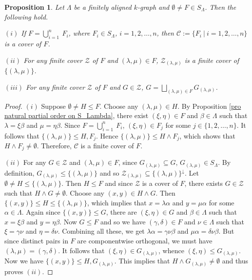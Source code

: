 \documentclass[a4paper,reqno,11pt]{amsart}
\numberwithin{equation}{section}
\newtheorem{prop}[thm]{Proposition}
\theoremstyle{definition}
\theoremstyle{remark}
\begin{document}
\begin{prop}\label{pro remarks on covers of an element}
Let $\Lambda$ be a finitely aligned $k$-graph and $\emptyset\neq F\in S_\Lambda$. Then the following hold.

$(i)$ If $F=\displaystyle{\bigcup_{i=1}^{n}}~F_i$, where $F_i\in S_\Lambda$, $i=1,2,\ldots,n$, then $\mathcal{C}:=\{F_i~|~i=1,2,\ldots,n\}$ is a cover of $F$.

$(ii)$ For any finite cover $\mathcal{Z}$ of $F$ and $(\lambda,\mu)\in F$, $\mathcal{Z}_{(\lambda,\mu)}$ is a finite cover of $\{(\lambda,\mu)\}$.

$(iii)$ For any finite cover $\mathcal{Z}$ of $F$ and $G\in \mathcal{Z}$, $G=\displaystyle{\bigsqcup_{(\lambda,\mu)\in F}}G_{(\lambda,\mu)}$. 
\end{prop}
\begin{proof}
$(i)$ Suppose $\emptyset \neq H\le F$. Choose any $(\lambda,\mu)\in H$. By Proposition \ref{pro natural partial order on S_Lambda}, there exist $(\xi,\eta)\in F$ and $\beta\in \Lambda$ such that $\lambda=\xi\beta$ and $\mu=\eta\beta$. Since $F=\displaystyle{\bigcup_{i=1}^{n}}~F_i$, $(\xi,\eta)\in F_j$ for some $j\in \{1,2,\ldots,n\}$. It follows that $\{(\lambda,\mu)\}\le H,F_j$. Hence $\{(\lambda,\mu)\}\le H\wedge F_j$, which shows that $H\wedge F_j\neq \emptyset$. Therefore, $\mathcal{C}$ is a finite cover of $F$. 

$(ii)$ For any $G\in \mathcal{Z}$ and $(\lambda,\mu)\in F$, since $G_{(\lambda,\mu)}\subseteq G$, $G_{(\lambda,\mu)}\in S_\Lambda$. By definition, $G_{(\lambda,\mu)}\le \{(\lambda,\mu)\}$ and so $\mathcal{Z}_{(\lambda,\mu)}\subseteq \{(\lambda,\mu)\}^{\downarrow}$. Let $\emptyset \neq H\le \{(\lambda,\mu)\}$. Then $H\le F$ and since $\mathcal{Z}$ is a cover of $F$, there exists $G\in \mathcal{Z}$ such that $H\wedge G\neq \emptyset$. Choose any $(x,y)\in H\wedge G$. Then $\{(x,y)\}\le H\le \{(\lambda,\mu)\}$, which implies that $x=\lambda\alpha$ and $y=\mu\alpha$ for some $\alpha\in \Lambda$. Again since $\{(x,y)\}\le G$, there are $(\xi,\eta)\in G$ and $\beta\in \Lambda$ such that $x=\xi\beta$ and $y=\eta\beta$. Now $G\le F$ and so we have $(\gamma,\delta)\in F$ and $\nu\in \Lambda$ such that $\xi=\gamma\nu$ and $\eta=\delta\nu$. Combining all these, we get $\lambda\alpha=\gamma\nu\beta$ and $\mu\alpha=\delta\nu\beta$. But since distinct pairs in $F$ are componentwise orthogonal, we must have $(\lambda,\mu)=(\gamma,\delta)$. It follows that $(\xi,\eta)\in G_{(\lambda,\mu)}$, whence $(\xi,\eta)\le G_{(\lambda,\mu)}$. Now we have $\{(x,y)\}\le H,G_{(\lambda,\mu)}$. This implies that $H\wedge G_{(\lambda,\mu)}\neq \emptyset$ and thus proves $(ii)$. 


\end{proof}
\end{document}
